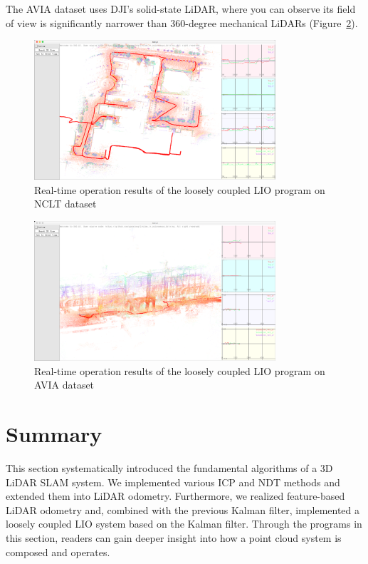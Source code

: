 The AVIA dataset uses DJI's solid-state LiDAR, where you can observe its field of view is significantly narrower than 360-degree mechanical LiDARs (Figure~\ref{fig:avia-loosely-lio}).

\begin{figure}[!t]
	\centering
	\includegraphics[width=0.8\textwidth]{resources/3d-lidar-mapping/loosely-nclt.png}
	\caption{Real-time operation results of the loosely coupled LIO program on NCLT dataset}
	\label{fig:nclt-loosely-lio}
\end{figure}

\begin{figure}[!t]
	\centering
	\includegraphics[width=0.8\textwidth]{resources/3d-lidar-mapping/avia01.png}
	\caption{Real-time operation results of the loosely coupled LIO program on AVIA dataset}
	\label{fig:avia-loosely-lio}
\end{figure}


\section{Summary}
This section systematically introduced the fundamental algorithms of a 3D LiDAR SLAM system. We implemented various ICP and NDT methods and extended them into LiDAR odometry. Furthermore, we realized feature-based LiDAR odometry and, combined with the previous Kalman filter, implemented a loosely coupled LIO system based on the Kalman filter. Through the programs in this section, readers can gain deeper insight into how a point cloud system is composed and operates.

